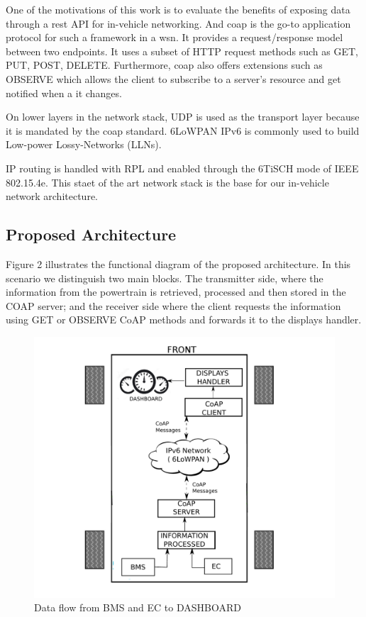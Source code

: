\documentclass[runningheads]{llncs}
\begin{document}
One of the motivations of this work is to evaluate the benefits of exposing 
data through a \gls{rest} API for in-vehicle networking. And \gls{coap} is the 
go-to application protocol for such a framework in a \gls{wsn}. It provides a 
request/response model between two endpoints. It uses a subset of HTTP request 
methods such as GET, PUT, POST, DELETE. Furthermore, \gls{coap} also offers 
extensions such as OBSERVE which allows the client to subscribe to a server's 
resource and get notified when a it changes.

On lower layers in the network stack, UDP is used as the transport layer 
because it is mandated by the \gls{coap} standard.
6LoWPAN IPv6 is commonly used to build Low-power Lossy-Networks (LLNs).

IP routing is handled with RPL and enabled through the 6TiSCH mode of IEEE
802.15.4e. {\color{blue} This staet of the art network stack is the base for our
in-vehicle network architecture.}
	
\subsection{Proposed Architecture}
Figure 2 illustrates the functional diagram of the proposed architecture.
In this scenario we distinguish two main blocks. The transmitter side, where
the information from the powertrain is retrieved, processed and then stored in
the COAP server; and the receiver side where the client requests the information
using GET or OBSERVE CoAP methods and forwards it to the displays handler.






\begin{figure}[!h]
\includegraphics[width=\textwidth] {Information_Flow_Network.pdf}

\caption{Data flow from BMS and EC to DASHBOARD} \label{fig2}
\end{figure}
\end{document}
